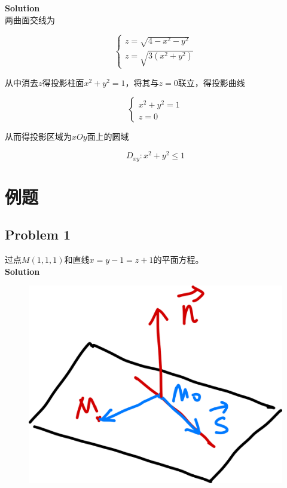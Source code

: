 \documentclass[12pt, a4paper]{article}
\numberwithin{equation}{section}
\begin{document}
    \textbf{Solution}
    \\

    两曲面交线为

    $$
        \left\{\begin{array}{l}
        z=\sqrt{4-x^2-y^2} \\
        z=\sqrt{3\left(x^2+y^2\right)}
        \end{array}\right.
    $$

    从中消去\(z\)得投影柱面\(x^2 + y^2 = 1\)，将其与\(z=0\)联立，得投影曲线

    $$
        \left\{\begin{array}{l}
        x^2+y^2=1 \\
        z=0
        \end{array}\right.
    $$

    从而得投影区域为\(xOy\)面上的圆域

    $$
    D_{xy}: x^2 + y^2 \leq 1
    $$

\section{例题}

\subsection{Problem 1}

    过点\(M\left(1,1,1\right)\)和直线\(x=y-1=z+1\)的平面方程。
    \\

    \textbf{Solution}
    \\

    \begin{figure}
        \centering
        \includegraphics[scale=0.06]{"Chapter 08 images/pic19.png"}
        \label{pic19}
    \end{figure}
\end{document}
